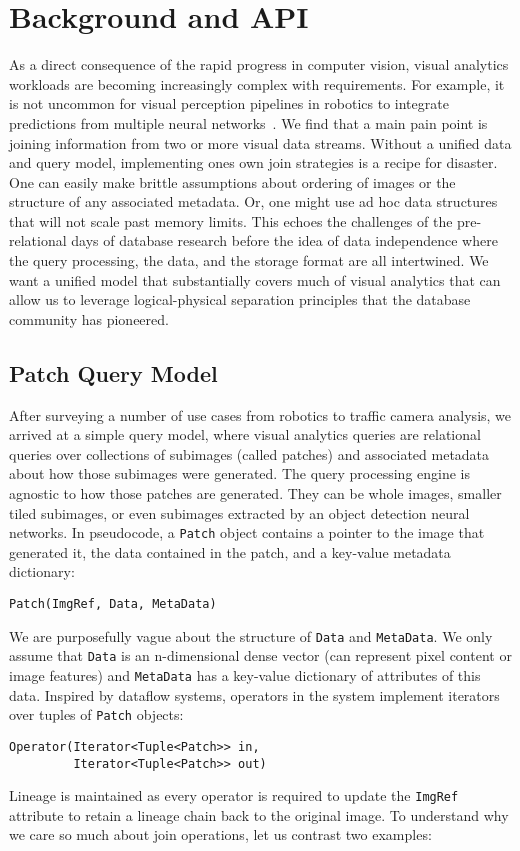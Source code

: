\section{Background and API}
As a direct consequence of the rapid progress in computer vision, visual analytics workloads are becoming increasingly complex with requirements. 
For example, it is not uncommon for visual perception pipelines in robotics to integrate predictions from multiple neural networks~\cite{hodson2018robots}.
We find that a main pain point is joining information from two or more visual data streams.
Without a unified data and query model, implementing ones own join strategies is a recipe for disaster.
One can easily make brittle assumptions about ordering of images or the structure of any associated metadata.
Or, one might use ad hoc data structures that will not scale past memory limits.
This echoes the challenges of the pre-relational days of database research before the idea of data independence where the query processing, the data, and the storage format are all intertwined.
We want a unified model that substantially covers much of visual analytics that can allow us to leverage logical-physical separation principles that the database community has pioneered.

\subsection{Patch Query Model}
After surveying a number of use cases from robotics to traffic camera analysis, we arrived at a simple query model, where visual analytics queries are relational queries over collections of subimages (called patches) and associated metadata about how those subimages were generated.
The query processing engine is agnostic to how those patches are generated.
They can be whole images, smaller tiled subimages, or even subimages extracted by an object detection neural networks.
In pseudocode, a \texttt{Patch} object contains a pointer to the image that generated it, the data contained in the patch, and a key-value metadata dictionary:
\begin{lstlisting}
Patch(ImgRef, Data, MetaData)
\end{lstlisting}
We are purposefully vague about the structure of \texttt{Data} and \texttt{MetaData}. We only assume that \texttt{Data} is an n-dimensional dense vector (can represent pixel content or image features) and \texttt{MetaData} has a key-value dictionary of attributes of this data.
Inspired by dataflow systems, operators in the system implement iterators over tuples of \texttt{Patch} objects:
\begin{lstlisting}
Operator(Iterator<Tuple<Patch>> in, 
         Iterator<Tuple<Patch>> out)
\end{lstlisting}
Lineage is maintained as every operator is required to update the \texttt{ImgRef} attribute to retain a lineage chain back to the original image.
To understand why we care so much about join operations, let us contrast two examples:

